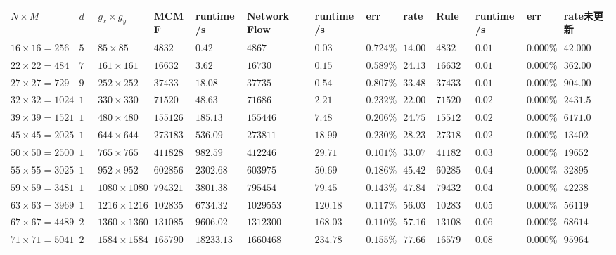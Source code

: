 \documentclass[]{article}
\begin{document}
\begin{longtable}[c]{@{}lllllllllllll@{}}
\toprule
\(N\times M\) & \(d\) & \(g_x\times g_y\) & MCMF & runtime/s & Network
Flow & runtime/s & err & rate & Rule & runtime/s & err &
rate未更新\tabularnewline
\midrule
\endhead
\(16\times 16=256\) & \(5\) & \(85\times 85\) & \(4832\) & \(0.42\) &
\(4867\) & \(0.03\) & \(0.724\%\) & \(14.000\) & \(4832\) & \(0.01\) &
\(0.000\%\) & \(42.000\)\tabularnewline
\(22\times 22= 484 \) & \(7\) & \(161\times 161\) & \(16632\) & \(3.62\)
& \(16730\) & \(0.15\) & \(0.589\%\) & \(24.133\) & \(16632\) & \(0.01\)
& \(0.000\%\) & \(362.00\)\tabularnewline
\(27\times 27= 729 \) & \(9\) & \(252\times 252\) & \(37433\) &
\(18.08\) & \(37735\) & \(0.54\) & \(0.807\%\) & \(33.481\) & \(37433\)
& \(0.01\) & \(0.000\%\) & \(904.00\)\tabularnewline
\(32\times 32= 1024\) & \(10\) & \(330\times 330\) & \(71520\) &
\(48.63\) & \(71686\) & \(2.21\) & \(0.232\%\) & \(22.005\) & \(71520\)
& \(0.02\) & \(0.000\%\) & \(2431.5\)\tabularnewline
\(39\times 39= 1521\) & \(12\) & \(480\times 480\) & \(155126\) &
\(185.13\) & \(155446\) & \(7.48\) & \(0.206\%\) & \(24.750\) &
\(155126\) & \(0.02\) & \(0.000\%\) & \(6171.0\)\tabularnewline
\(45\times 45= 2025\) & \(14\) & \(644\times 644\) & \(273183\) &
\(536.09\) & \(273811\) & \(18.99\) & \(0.230\%\) & \(28.230\) &
\(273183\) & \(0.02\) & \(0.000\%\) & \(13402\)\tabularnewline
\(50\times 50= 2500\) & \(15\) & \(765\times 765\) & \(411828\) &
\(982.59\) & \(412246\) & \(29.71\) & \(0.101\%\) & \(33.073\) &
\(411828\) & \(0.03\) & \(0.000\%\) & \(19652\)\tabularnewline
\(55\times 55= 3025\) & \(17\) & \(952\times 952\) & \(602856\) &
\(2302.68\) & \(603975\) & \(50.69\) & \(0.186\%\) & \(45.427\) &
\(602856\) & \(0.04\) & \(0.000\%\) & \(32895\)\tabularnewline
\(59\times 59= 3481\) & \(18\) & \(1080\times 1080\) & \(794321\) &
\(3801.38\) & \(795454\) & \(79.45\) & \(0.143\%\) & \(47.846\) &
\(794321\) & \(0.04\) & \(0.000\%\) & \(42238\)\tabularnewline
\(63\times 63= 3969\) & \(19\) & \(1216\times 1216\) & \(1028354\) &
\(6734.32\) & \(1029553\) & \(120.18\) & \(0.117\%\) & \(56.035\) &
\(1028354\) & \(0.05\) & \(0.000\%\) & \(56119\)\tabularnewline
\(67\times 67= 4489\) & \(20\) & \(1360\times 1360\) & \(1310859\) &
\(9606.02\) & \(1312300\) & \(168.03\) & \(0.110\%\) & \(57.168\) &
\(1310859\) & \(0.06\) & \(0.000\%\) & \(68614\)\tabularnewline
\(71\times 71=5041\) & \(22\) & \(1584\times 1584\) & \(1657902\) &
\(18233.13\) & \(1660468\) & \(234.78\) & \(0.155\%\) & \(77.660\) &
\(1657902\) & \(0.08\) & \(0.000\%\) & \(95964\)\tabularnewline
\bottomrule
\end{longtable}
\end{document}
